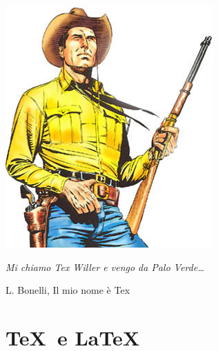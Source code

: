\documentclass[svgnames,%
	ucs,%
	pdftex]{guitbeamer}
\begin{document}
\begin{frame}
\includegraphics[scale=.5]{texwiller.jpg}

  \itshape
	Mi chiamo Tex Willer e vengo da Palo Verde\dots
	\begin{flushright}
		\upshape
		L. Bonelli, Il mio nome \`e Tex
	\end{flushright}
\end{frame}
\section{\TeX\ e \LaTeX}
\end{document}
